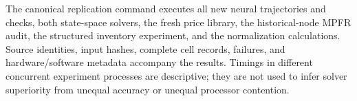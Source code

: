 The canonical replication command executes all new neural trajectories and checks, both state-space solvers, the fresh price library, the historical-node MPFR audit, the structured inventory experiment, and the normalization calculations. Source identities, input hashes, complete cell records, failures, and hardware/software metadata accompany the results. Timings in different concurrent experiment processes are descriptive; they are not used to infer solver superiority from unequal accuracy or unequal processor contention.
